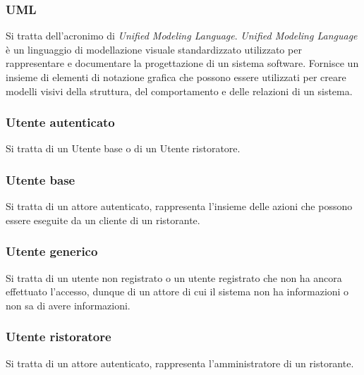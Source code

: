 
\subsubsection*{UML}
Si tratta dell'acronimo di \textit{Unified Modeling Language}.
\textit{Unified Modeling Language} è un linguaggio di modellazione visuale
standardizzato utilizzato per rappresentare e documentare la progettazione di un
sistema software.
Fornisce un insieme di elementi di notazione grafica che possono essere
utilizzati per creare modelli visivi della struttura, del comportamento e delle
relazioni di un sistema.

\subsubsection*{Utente autenticato}
Si tratta di un Utente base o di un Utente ristoratore.

\subsubsection*{Utente base}
\label{utenteBase}
Si tratta di un attore autenticato, rappresenta l'insieme delle azioni che
possono essere eseguite da un cliente di un ristorante.

\subsubsection*{Utente generico}
Si tratta di un utente non registrato o un utente registrato che non ha ancora
effettuato l’accesso, dunque di un attore di cui il sistema non ha informazioni
o non sa di avere informazioni.

\subsubsection*{Utente ristoratore}
Si tratta di un attore autenticato, rappresenta l'amministratore di un
ristorante.

\newpage
